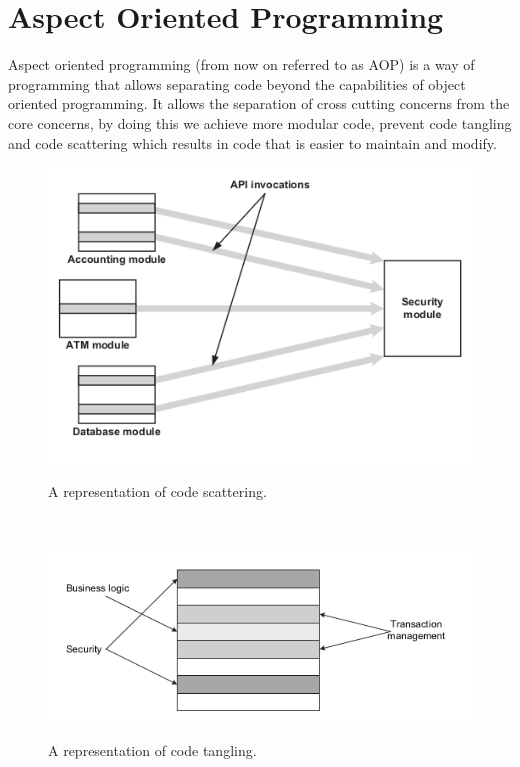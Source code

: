 \documentclass[a4paper]{report}
\begin{document}
\section*{Aspect Oriented Programming}
Aspect oriented programming (from now on referred to as AOP) is a way of programming that allows separating code beyond the capabilities of object oriented programming. It allows the separation of cross cutting concerns from the core concerns, by doing this we achieve more modular code, prevent code tangling and code scattering which results in code that is easier to maintain and modify.
\begin{figure}[h!]
\centering
\includegraphics[scale=0.5]{images/Code_Scattering.png}
\label{fig:Code_Scattering}
\caption{A representation of code scattering\cite{Laddad10}.}
\end{figure}\\
\begin{figure}[h!]
\centering
\includegraphics[scale=0.5]{images/Code_Tangling.png}
\label{fig:Code_Tangling}
\caption{A representation of code tangling\cite{Laddad10}.}
\end{figure}\\
\end{document}
